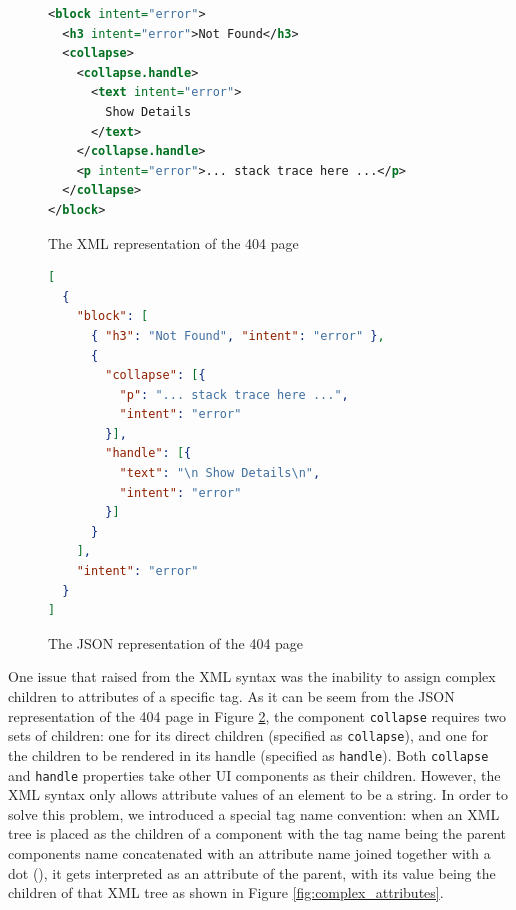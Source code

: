 \begin{figure}
\begin{minipage}{\linewidth}
\begin{lstlisting}[language=xml]
<block intent="error">
  <h3 intent="error">Not Found</h3>
  <collapse>
    <collapse.handle>
      <text intent="error">
        Show Details
      </text>
    </collapse.handle>
    <p intent="error">... stack trace here ...</p>
  </collapse>
</block>
\end{lstlisting}
\end{minipage}
\caption{The XML representation of the 404 page}%
\label{fig:syntax_xml}%
\end{figure}

\begin{figure}
\begin{minipage}{\linewidth}
\begin{lstlisting}[language=json]
[
  {
    "block": [
      { "h3": "Not Found", "intent": "error" },
      {
        "collapse": [{
          "p": "... stack trace here ...",
          "intent": "error"
        }],
        "handle": [{
          "text": "\n Show Details\n",
          "intent": "error"
        }]
      }
    ],
    "intent": "error"
  }
]
\end{lstlisting}
\end{minipage}
\caption{The JSON representation of the 404 page}%
\label{fig:syntax_json}%
\end{figure}


One issue that raised from the XML syntax was the inability to assign complex children to attributes of a specific tag. As it can be seem from the JSON representation of the 404 page in Figure \ref{fig:syntax_json}, the component \texttt{collapse} requires two sets of children: one for its direct children (specified as \texttt{collapse}), and one for the children to be rendered in its handle (specified as \texttt{handle}). Both \texttt{collapse} and \texttt{handle} properties take other UI components as their children. However, the XML syntax only allows attribute values of an element to be a string. In order to solve this problem, we introduced a special tag name convention: when an XML tree is placed as the children of a component with the tag name being the parent components name concatenated with an attribute name joined together with a dot (), it gets interpreted as an attribute of the parent, with its value being the children of that XML tree as shown in Figure \ref{fig:complex_attributes}.

